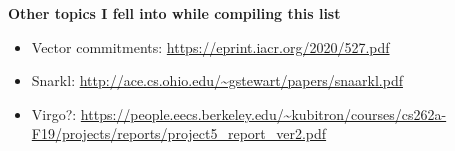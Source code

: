 \vspace*{1em}
{\footnotesize
\hspace*{-1em}\textbf{Other topics I fell into while compiling this list}
\begin{itemize}
	\item Vector commitments: \url{https://eprint.iacr.org/2020/527.pdf}
	\item Snarkl: \url{http://ace.cs.ohio.edu/~gstewart/papers/snaarkl.pdf}
	\item Virgo?: \url{https://people.eecs.berkeley.edu/~kubitron/courses/cs262a-F19/projects/reports/project5_report_ver2.pdf}
\end{itemize} 
}
